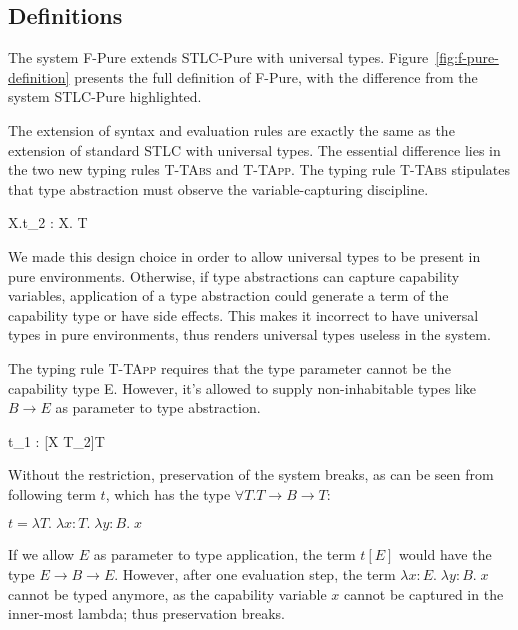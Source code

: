 \subsection{Definitions}

The system F-Pure extends STLC-Pure with universal
types. Figure~\ref{fig:f-pure-definition} presents the full definition
of F-Pure, with the difference from the system STLC-Pure highlighted.

The extension of syntax and evaluation rules are exactly the same as
the extension of standard STLC with universal types.  The essential
difference lies in the two new typing rules \textsc{T-TAbs} and
\textsc{T-TApp}. The typing rule \textsc{T-TAbs} stipulates that type
abstraction must observe the variable-capturing discipline.

{ \Gamma \vdash \lambda X.t_2 : \forall X. T }

We made this design choice in order to allow universal types to be
present in pure environments. Otherwise, if type abstractions can
capture capability variables, application of a type abstraction could
generate a term of the capability type or have side effects. This
makes it incorrect to have universal types in pure environments, thus
renders universal types useless in the system.

The typing rule \textsc{T-TApp} requires that the type parameter
cannot be the capability type E. However, it's allowed to supply
non-inhabitable types like $B \to E$ as parameter to type abstraction.


{ \Gamma \vdash t_1 \; [T_2] : [X \mapsto T_2]T }

Without the restriction, preservation of the system breaks, as can be
seen from following term $t$, which has the type
$\forall T. T \to B \to T$:

\begin{center}
  $t = \lambda T. \; \lambda x:T. \; \lambda y:B. \; x$
\end{center}

If we allow $E$ as parameter to type application, the term $t [E]$
would have the type $E \to B \to E$. However, after one evaluation
step, the term $\lambda x:E. \; \lambda y:B. \; x$ cannot be typed
anymore, as the capability variable $x$ cannot be captured in the
inner-most lambda; thus preservation breaks.

